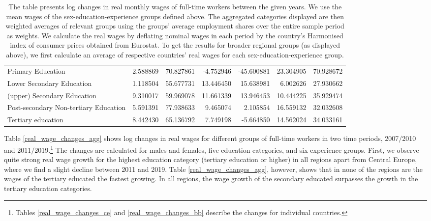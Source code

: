\documentclass[11pt]{article}
\begin{document}
\begin{table}[!htbp]
\begin{center}
{\begin{tabular}{lrrrrrr}
Primary Education                     &   2.588869 &  70.827861 &  -4.752946 & -45.600881 &  23.304905 &  70.928672 \\
Lower Secondary Education             &   1.118504 &  55.677731 &  13.446450 &  15.638981 &   6.002626 &  27.930662 \\
(upper) Secondary Education           &   9.310017 &  59.969078 &  11.661339 &  13.946453 &  10.444225 &  35.929474 \\
Post-secondary Non-tertiary Education &   5.591391 &  77.938633 &   9.465074 &   2.105854 &  16.559132 &  32.032608 \\
Tertiary education                    &   8.442430 &  65.136792 &   7.749198 &  -5.664850 &  14.562024 &  34.033161 \\
\bottomrule
\end{tabular}

}
\caption*{\footnotesize The table presents log changes in real monthly wages of full-time workers between the given years. We use the mean wages of the sex-education-experience groups defined above. The aggregated categories displayed are then weighted averages of relevant groups using the groups' average employment shares over the entire sample period as weights. We calculate the real wages by deflating nominal wages in each period by the country's Harmonised index of consumer prices obtained from Eurostat. To get the results for broader regional groups (as displayed above), we first calculate an average of respective countries' real wages for each sex-education-experience group. }
\end{center}
\end{table}




Table \ref{real_wage_changes_agg} shows log changes in real wages for different groups of full-time workers in two time periods, 2007$/$2010 and 2011$/$2019.\footnote{Tables \ref{real_wage_changes_ce} and \ref{real_wage_changes_bb} describe the changes for individual countries.} The changes are calculated for males and females, five education categories, and six experience groups. First, we observe quite strong real wage growth for the highest education category (tertiary education or higher) in all regions apart from Central Europe, where we find a slight decline between 2011 and 2019. Table \ref{real_wage_changes_agg}, however, shows that in none of the regions are the wages of the tertiary educated the fastest growing. In all regions, the wage growth of the secondary educated surpasses the growth in the tertiary education categories.
\end{document}
